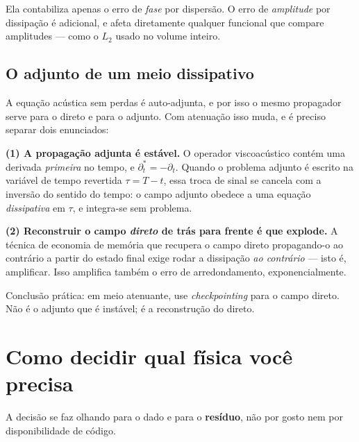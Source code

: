 \documentclass[11pt,a4paper,oneside]{report}
\begin{document}
\begin{atencao}
Ela contabiliza apenas o erro de \emph{fase} por dispers\~ao. O erro de
\emph{amplitude} por dissipa\c{c}\~ao \'e adicional, e afeta diretamente
qualquer funcional que compare amplitudes --- como o $L_2$ usado no volume
inteiro.
\end{atencao}

\subsection*{O adjunto de um meio dissipativo}
\label{sec:adjunto-visco}

\begin{teoria}
A equa\c{c}\~ao ac\'ustica sem perdas \'e auto-adjunta, e por isso o mesmo
propagador serve para o direto e para o adjunto. Com atenua\c{c}\~ao isso
muda, e \'e preciso separar dois enunciados:

\textbf{(1) A propaga\c{c}\~ao adjunta \'e est\'avel.} O operador
viscoac\'ustico cont\'em uma derivada \emph{primeira} no tempo, e
$\partial_t^{*} = -\partial_t$. Quando o problema adjunto \'e escrito na
vari\'avel de tempo revertida $\tau = T - t$, essa troca de sinal se cancela
com a invers\~ao do sentido do tempo: o campo adjunto obedece a uma
equa\c{c}\~ao \emph{dissipativa} em $\tau$, e integra-se sem problema.

\textbf{(2) Reconstruir o campo \emph{direto} de tr\'as para frente \'e que
explode.} A t\'ecnica de economia de mem\'oria que recupera o campo direto
propagando-o ao contr\'ario a partir do estado final exige rodar a
dissipa\c{c}\~ao \emph{ao contr\'ario} --- isto \'e, amplificar. Isso
amplifica tamb\'em o erro de arredondamento, exponencialmente.

Conclus\~ao pr\'atica: em meio atenuante, use \emph{checkpointing} para o
campo direto. N\~ao \'e o adjunto que \'e inst\'avel; \'e a reconstru\c{c}\~ao
do direto.
\end{teoria}

\section{Como decidir qual f\'isica voc\^e precisa}

A decis\~ao se faz olhando para o dado e para o \textbf{res\'iduo}, n\~ao por
gosto nem por disponibilidade de c\'odigo.
\end{document}
